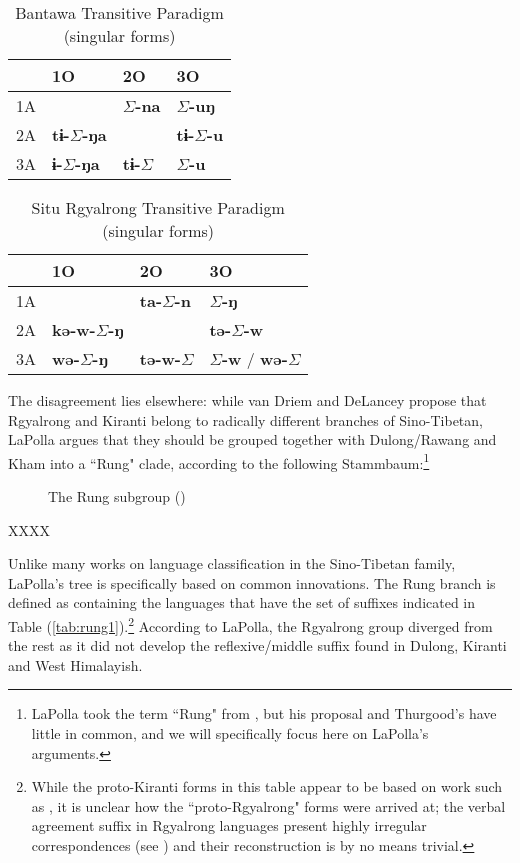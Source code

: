 \documentclass[oldfontcommands,oneside,a4paper,11pt]{article}
\newcommand{\ipa}[1]{{\phon\textbf{#1}}}
\newcommand{\grise}[1]{\cellcolor{lightgray}\textbf{#1}}
\newcommand{\ra}{$\Sigma$}
\begin{document}
 \begin{table}[H]
 \caption{Bantawa Transitive Paradigm (singular forms)} \centering \label{tab:bantawa}
 \begin{tabular}{l|l|l|l|}
  &1O&2O&3O\\
 \hline
1A & 	\grise{} & 	\ipa{\ra{}-na} & 	\ipa{\ra{}-uŋ} \\ 
2A & 	\ipa{tɨ-\ra{}-ŋa} & 	\grise{}	 & 	\ipa{tɨ-\ra{}-u} \\ 
3A & 	\ipa{ɨ-\ra{}-ŋa} & 	\ipa{tɨ-\ra{}} & 	\ipa{\ra{}-u} \\ 
 \hline
\end{tabular}
\end{table}

 \begin{table}[H]
 \caption{Situ Rgyalrong Transitive Paradigm (singular forms)} \centering \label{tab:situ}
 \begin{tabular}{l|l|l|l|}
  &1O&2O&3O\\
 \hline
1A & 	\grise{} & 	\ipa{ta-\ra{}-n} & 	\ipa{\ra{}-ŋ} \\ 
2A & 	\ipa{kə-w-\ra{}-ŋ} & 	\grise{}	 & 	\ipa{tə-\ra{}-w} \\ 
3A & 	\ipa{wə-\ra{}-ŋ} & 	\ipa{tə-w-\ra{}} & 	\ipa{\ra{}-w} / \ipa{wə-\ra{}} \\ 
 \hline
\end{tabular}
\end{table}


The  disagreement lies elsewhere: while van Driem and DeLancey propose that Rgyalrong and Kiranti belong to radically different branches of Sino-Tibetan, LaPolla argues that they should be grouped together with Dulong/Rawang and Kham into a ``Rung" clade, according to the following Stammbaum:\footnote{LaPolla took the term ``Rung" from \citet{thurgood85pro} , but his proposal and Thurgood's have little in common, and we will specifically focus here on LaPolla's arguments. }
\begin{figure}[H]
\caption{The Rung subgroup (\citealt[394]{lapolla05st})} \label{fig:rung}
\begin{newicktree}
  \small
  \setunitlength{20cm} \righttree \nobranchlengths \nodelabelformat{}
  \par \scalebar[0.1]
\end{newicktree}
\end{figure}
XXXX

Unlike many works on language classification in the Sino-Tibetan family, LaPolla's tree is specifically based on   common innovations. The Rung branch is defined as containing the languages that have the set of suffixes indicated in Table (\ref{tab:rung1}).\footnote{While the proto-Kiranti forms in this table appear to be based on  work such as \citet{driem93agreement}, it is unclear how the ``proto-Rgyalrong" forms  were arrived at; the verbal agreement suffix in Rgyalrong languages present highly irregular correspondences (see \citealt{gongxun14agreement}) and their reconstruction is by no means trivial. } According to LaPolla, the Rgyalrong group diverged from the rest as it did not develop the reflexive/middle suffix found in Dulong, Kiranti and West Himalayish.
\end{document}
